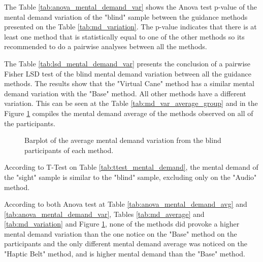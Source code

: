 

The Table \ref{tab:anova_mental_demand_var} shows the Anova test p-value of the mental demand variation of the "blind" sample between the guidance methods presented on the Table \ref{tab:md_variation}. The p-value indicates that there is at least one method that is statistically equal to one of the other methods so its recommended to do a pairwise analyses between all the methods.





The Table \ref{tab:lsd_mental_demand_var} presents the conclusion of a pairwise Fisher LSD test of the blind mental demand variation between all the guidance methods. The results show that the "Virtual Cane" method has a similar mental demand variation with the "Base" method. All other methods have a different variation. This can be seen at the Table \ref{tab:md_var_average_group} and in the Figure \ref{fig:barplot_md_var_scene_blind} compiles the mental demand average of the methods observed on all of the participants.





\begin{figure}[!htb]
    \centering
    \resizebox{0.6\linewidth}{!}{
    
    }
    \caption{Barplot of the average mental demand variation from the blind participants of each method.}
    \label{fig:barplot_md_var_scene_blind}
\end{figure}

According to T-Test on Table \ref{tab:ttest_mental_demand}, the mental demand of the "sight" sample is similar to the "blind" sample, excluding only on the "Audio" method.

According to both Anova test at Table \ref{tab:anova_mental_demand_avg} and \ref{tab:anova_mental_demand_var}, Tables \ref{tab:md_average} and \ref{tab:md_variation} and Figure \ref{fig:barplot_md_var_scene_blind}, none of the methods did provoke a higher mental demand variation than the one notice on the "Base" method on the participants and the only different mental demand average was noticed on the "Haptic Belt" method, and is higher mental demand than the "Base" method.

